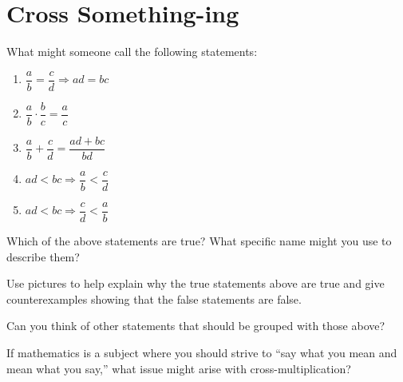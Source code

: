 \newpage
\section{Cross Something-ing}\label{A:CrossSomething}


\begin{prob} 
What might someone call the following statements:
\begin{enumerate}
\item $\dfrac{a}{b} = \dfrac{c}{d} \Rightarrow ad = bc$
\item $\dfrac{a}{b}\cdot \dfrac{b}{c} = \dfrac{a}{c}$
\item $\dfrac{a}{b} +\dfrac{c}{d} = \dfrac{ad+bc}{bd}$
\item $ad < bc \Rightarrow \dfrac{a}{b} < \dfrac{c}{d}$
\item $ad < bc \Rightarrow \dfrac{c}{d} < \dfrac{a}{b}$
\end{enumerate}
\end{prob}

\begin{prob}
Which of the above statements are true? What specific name might you
use to describe them?
\end{prob}

\begin{prob} 
Use pictures to help explain why the true statements above are true
and give counterexamples showing that the false statements are false.
\end{prob}


\begin{prob} 
Can you think of other statements that should be grouped with those
above?
\end{prob}

\begin{prob}
If mathematics is a subject where you should strive to ``say what you
mean and mean what you say,'' what issue might arise with
cross-multiplication?
\end{prob}

